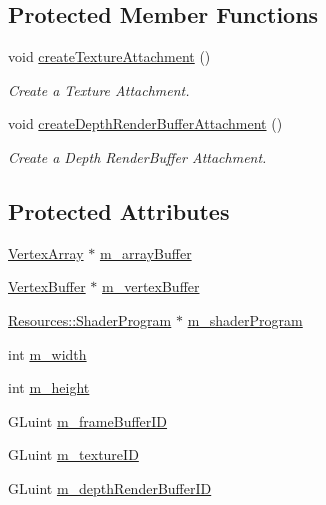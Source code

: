 \subsection*{Protected Member Functions}
\begin{DoxyCompactItemize}
\item 
void \hyperlink{class_cookie_eng_1_1_graphics_1_1_frame_buffer_a7ebc5f799dddcaa97bf514b06d110cb1}{create\+Texture\+Attachment} ()
\begin{DoxyCompactList}\small\item\em Create a Texture Attachment. \end{DoxyCompactList}\item 
void \hyperlink{class_cookie_eng_1_1_graphics_1_1_frame_buffer_aa0b8e867cb21fee1d79d6f48026e7c0b}{create\+Depth\+Render\+Buffer\+Attachment} ()
\begin{DoxyCompactList}\small\item\em Create a Depth Render\+Buffer Attachment. \end{DoxyCompactList}\end{DoxyCompactItemize}
\subsection*{Protected Attributes}
\begin{DoxyCompactItemize}
\item 
\hyperlink{class_cookie_eng_1_1_graphics_1_1_vertex_array}{Vertex\+Array} $\ast$ \hyperlink{class_cookie_eng_1_1_graphics_1_1_frame_buffer_aeeda746eb63aecba700a50a92efd37ef}{m\+\_\+array\+Buffer}
\item 
\hyperlink{class_cookie_eng_1_1_graphics_1_1_vertex_buffer}{Vertex\+Buffer} $\ast$ \hyperlink{class_cookie_eng_1_1_graphics_1_1_frame_buffer_aa24abca002f6a2c2bdc97e71cf0e737f}{m\+\_\+vertex\+Buffer}
\item 
\hyperlink{class_cookie_eng_1_1_resources_1_1_shader_program}{Resources\+::\+Shader\+Program} $\ast$ \hyperlink{class_cookie_eng_1_1_graphics_1_1_frame_buffer_a0f2e548b0dd918b358f1ba42308d275e}{m\+\_\+shader\+Program}
\item 
int \hyperlink{class_cookie_eng_1_1_graphics_1_1_frame_buffer_ac91635b3617b4d7c8bef5a24eafdd7ae}{m\+\_\+width}
\item 
int \hyperlink{class_cookie_eng_1_1_graphics_1_1_frame_buffer_abdbb577ba114e681f7536d2927f46a3b}{m\+\_\+height}
\item 
G\+Luint \hyperlink{class_cookie_eng_1_1_graphics_1_1_frame_buffer_a64227f6632d34e67d3f5d4b4f7e3efe9}{m\+\_\+frame\+Buffer\+ID}
\item 
G\+Luint \hyperlink{class_cookie_eng_1_1_graphics_1_1_frame_buffer_a609afe09f88a1c9a928813d8b89c27cd}{m\+\_\+texture\+ID}
\item 
G\+Luint \hyperlink{class_cookie_eng_1_1_graphics_1_1_frame_buffer_a2b5c44481b74bc7f82a12b0977c9b356}{m\+\_\+depth\+Render\+Buffer\+ID}
\end{DoxyCompactItemize}


